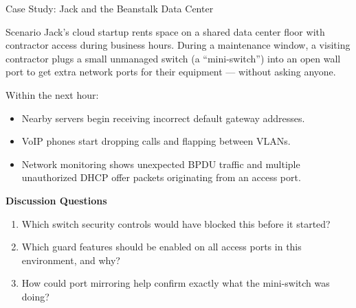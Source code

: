 \documentclass[aspectratio=169]{beamer}  %
\begin{document}
\begin{frame}{Case Study: Jack and the Beanstalk Data Center}
    \begin{block}{Scenario}
        \footnotesize
        Jack's cloud startup rents space on a shared data center floor with contractor access during business hours. During a maintenance window, a visiting contractor plugs a small unmanaged switch (a ``mini-switch'') into an open wall port to get extra network ports for their equipment --- without asking anyone.

        Within the next hour:
        \begin{itemize}
            \item Nearby servers begin receiving incorrect default gateway addresses.
            \item VoIP phones start dropping calls and flapping between VLANs.
            \item Network monitoring shows unexpected BPDU traffic and multiple unauthorized DHCP offer packets originating from an access port.
        \end{itemize}
    \end{block}
    \textbf{Discussion Questions}
    \begin{enumerate}
        \item Which switch security controls would have blocked this before it started?
        \item Which guard features should be enabled on all access ports in this environment, and why?
        \item How could port mirroring help confirm exactly what the mini-switch was doing?
    \end{enumerate}
\end{frame}
\end{document}
